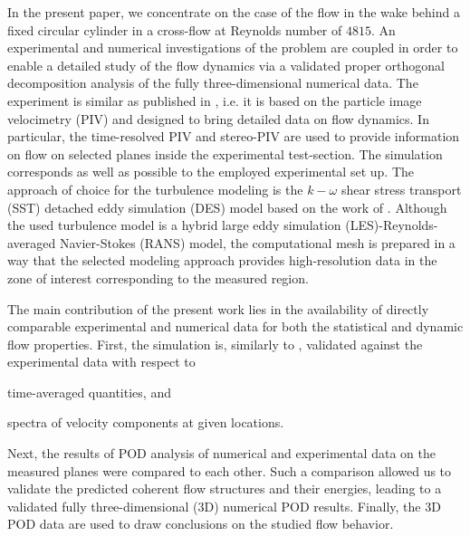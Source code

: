 
In the present paper, we concentrate on the case of the flow in the wake behind a {fixed} circular cylinder in a cross-flow at Reynolds number of $4815$. An experimental and numerical investigations of the problem are coupled in order to enable a detailed study of the flow dynamics via a validated proper orthogonal decomposition analysis of the fully three-dimensional numerical data. The experiment is similar as published in \citep{uruba2020,uruba2020a}, i.e. it is based on the particle image velocimetry (PIV) and designed to bring detailed data on flow dynamics. In particular, the time-resolved PIV and stereo-PIV are used to provide information on flow on selected planes inside the experimental test-section. The simulation corresponds as well as possible to the employed experimental set up. The approach of choice for the turbulence modeling is the $k-\omega$ shear stress transport (SST) detached eddy simulation (DES) model based on the work {of} \citet{strelets2001}. Although the used turbulence model is a hybrid large eddy simulation (LES)-Reynolds-averaged Navier-Stokes (RANS) model, the computational mesh is prepared in a way that the selected modeling approach provides high-resolution data in the zone of interest corresponding to the measured region.

The main contribution of the present work lies in {the} availability of directly comparable experimental and numerical data for both the statistical and dynamic flow properties. First, the simulation is, similarly to \citep{jie2016,gonzalez2019}, validated against the experimental data with respect to
\begin{inparaenum}[(i)]
        \item time-averaged quantities, and
        \item spectra of velocity components at given locations.
\end{inparaenum}
Next, the results of POD analysis of numerical and experimental data on the measured planes were compared to each other. Such a comparison allowed us to validate the predicted coherent flow structures and their energies, leading to {a} validated fully three-dimensional (3D) numerical POD results. Finally, the 3D POD data are used to draw conclusions on the studied flow behavior.

